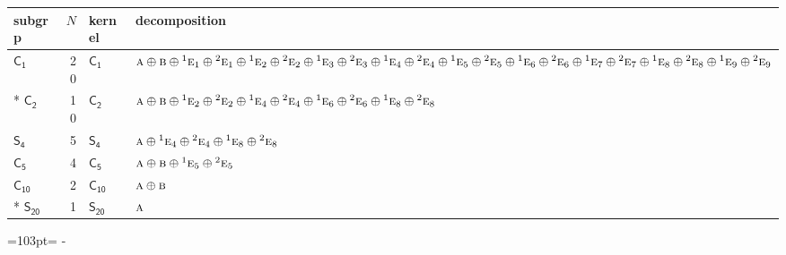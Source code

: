 \documentclass[10pt,a4paper]{article}
\newcommand{\needspace}[1]{\par\penalty-100\begingroup\dimen0=#1\relax\dimen2=\pagegoal
  \advance\dimen2-\pagetotal\ifdim\dimen0>\dimen2\relax\ifdim\dimen2>0pt\vfil\break\fi\fi
  \endgroup}
\numberwithin{equation}{section}
\newcommand{\grp}[1]{\mathsf{#1}}
\newcommand{\irr}[1]{\text{\normalfont\scshape #1}}
\newcommand{\conjpair}[1]{{}^{#1}}
\newlength{\fillwidth}\newlength{\cellwidth}\newlength{\colwidth}
\begin{document}
{\begin{longtable}{@{}lrl>{\RaggedRight\arraybackslash}p{\fillwidth}@{}}
subgrp & $N$ & kernel & decomposition\\\midrule\endhead
\bottomrule\endfoot\endlastfoot
\href{C1.pdf}{$\grp{C_{1}}$} & 20 & \href{C1.pdf}{$\grp{C_{1}}$} & $\irr{a}\oplus \irr{b}\oplus \conjpair{1}\irr{e}_{1}\oplus \conjpair{2}\irr{e}_{1}\oplus \conjpair{1}\irr{e}_{2}\oplus \conjpair{2}\irr{e}_{2}\oplus \conjpair{1}\irr{e}_{3}\oplus \conjpair{2}\irr{e}_{3}\oplus \conjpair{1}\irr{e}_{4}\oplus \conjpair{2}\irr{e}_{4}\oplus \conjpair{1}\irr{e}_{5}\oplus \conjpair{2}\irr{e}_{5}\oplus \conjpair{1}\irr{e}_{6}\oplus \conjpair{2}\irr{e}_{6}\oplus \conjpair{1}\irr{e}_{7}\oplus \conjpair{2}\irr{e}_{7}\oplus \conjpair{1}\irr{e}_{8}\oplus \conjpair{2}\irr{e}_{8}\oplus \conjpair{1}\irr{e}_{9}\oplus \conjpair{2}\irr{e}_{9}$\\*
\href{C2.pdf}{$\grp{C_{2}}$} & 10 & \href{C2.pdf}{$\grp{C_{2}}$} & $\irr{a}\oplus \irr{b}\oplus \conjpair{1}\irr{e}_{2}\oplus \conjpair{2}\irr{e}_{2}\oplus \conjpair{1}\irr{e}_{4}\oplus \conjpair{2}\irr{e}_{4}\oplus \conjpair{1}\irr{e}_{6}\oplus \conjpair{2}\irr{e}_{6}\oplus \conjpair{1}\irr{e}_{8}\oplus \conjpair{2}\irr{e}_{8}$\\
\href{S4.pdf}{$\grp{S_{4}}$} & 5 & \href{S4.pdf}{$\grp{S_{4}}$} & $\irr{a}\oplus \conjpair{1}\irr{e}_{4}\oplus \conjpair{2}\irr{e}_{4}\oplus \conjpair{1}\irr{e}_{8}\oplus \conjpair{2}\irr{e}_{8}$\\
\href{C5.pdf}{$\grp{C_{5}}$} & 4 & \href{C5.pdf}{$\grp{C_{5}}$} & $\irr{a}\oplus \irr{b}\oplus \conjpair{1}\irr{e}_{5}\oplus \conjpair{2}\irr{e}_{5}$\\
\href{C10.pdf}{$\grp{C_{10}}$} & 2 & \href{C10.pdf}{$\grp{C_{10}}$} & $\irr{a}\oplus \irr{b}$\\*
\href{S20.pdf}{$\grp{S_{20}}$} & 1 & \href{S20.pdf}{$\grp{S_{20}}$} & $\irr{a}$\\
\bottomrule\end{longtable}}
\needspace{103pt}
\end{document}
